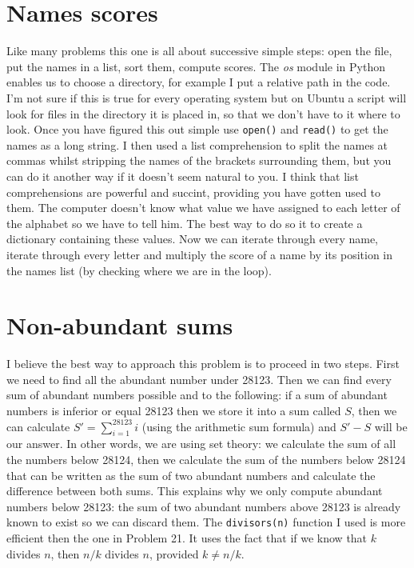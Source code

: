 \documentclass[11pt]{article}
\begin{document}
\section{Names scores}
Like many problems this one is all about successive simple steps: open the file, put the names in a list, sort them, compute scores. The \emph{os} module in Python enables us to choose a directory, for example I put a relative path in the code. I'm not sure if this is true for every operating system but on Ubuntu a script will look for files in the directory it is placed in, so that we don't have to it where to look. Once you have figured this out simple use \texttt{open()} and \texttt{read()} to get the names as a long string. I then used a list comprehension to split the names at commas whilst stripping the names of the brackets surrounding them, but you can do it another way if it doesn't seem natural to you. I think that list comprehensions are powerful and succint, providing you have gotten used to them. The computer doesn't know what value we have assigned to each letter of the alphabet so we have to tell him. The best way to do so it to create a dictionary containing these values. Now we can iterate through every name, iterate through every letter and multiply the score of a name by its position in the names list (by checking where we are in the loop).

\section{Non-abundant sums}
I believe the best way to approach this problem is to proceed in two steps. First we need to find all the abundant number under 28123. Then we can find every sum of abundant numbers possible and to the following: if a sum of abundant numbers is inferior or equal 28123 then we store it into a sum called $S$, then we can calculate $S'=\displaystyle\sum_{i=1}^{28123}i$ (using the arithmetic sum formula) and $S'-S$ will be our answer. In other words, we are using set theory: we calculate the sum of all the numbers below 28124, then we calculate the sum of the numbers below 28124 that can be written as the sum of two abundant numbers and calculate the difference between both sums. This explains why we only compute abundant numbers below 28123: the sum of two abundant numbers above 28123 is already known to exist so we can discard them. The \texttt{divisors(n)} function I used is more efficient then the one in Problem 21. It uses the fact that if we know that $k$ divides $n$, then $n/k$ divides $n$, provided $k \ne n/k$.
\end{document}
